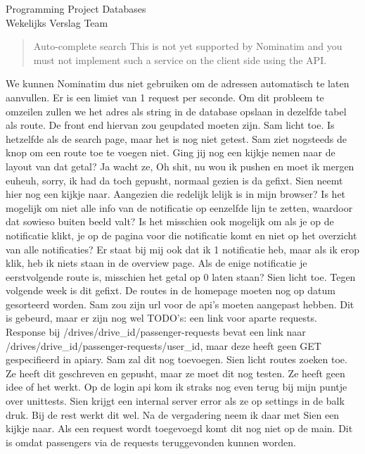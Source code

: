 \documentclass{article}
\newcounter{team}
\begin{document}
\begin{Minutes}{Programming Project Databases \\ Wekelijks Verslag Team }
\begin{quote}
                        Auto-complete search This is not yet supported by Nominatim and you must not implement such a service on the client side using the API.
				    \end{quote}
				    We kunnen Nominatim dus niet gebruiken om de adressen automatisch te laten aanvullen. Er is een limiet van 1 request per seconde. Om dit probleem te omzeilen zullen we het adres als string in de database opslaan in dezelfde tabel als route.
				    De front end hiervan zou geupdated moeten zijn. Sam licht toe. Is hetzelfde als de search page, maar het is nog niet getest. Sam ziet nogsteeds de knop om een route toe te voegen niet.
				  Ging jij nog een kijkje nemen naar de layout van dat getal? Ja wacht ze, Oh shit, nu wou ik pushen en moet ik mergen euheuh, sorry, ik had da toch gepusht, normaal gezien is da gefixt. Sien neemt hier nog een kijkje naar. Aangezien die redelijk lelijk is in mijn browser? Is het mogelijk om niet alle info van de notificatie op eenzelfde lijn te zetten, waardoor dat sowieso buiten beeld valt? Is het misschien ook mogelijk om als je op de notificatie klikt, je op de pagina voor die notificatie komt en niet op het overzicht van alle notificaties? Er staat bij mij ook dat ik 1 notificatie heb, maar als ik erop klik, heb ik niets staan in de overview page. Als de enige notificatie je eerstvolgende route is, misschien het getal op 0 laten staan? Sien licht toe. Tegen volgende week is dit gefixt.
                    De routes in de homepage moeten nog op datum gesorteerd worden.
				    Sam zou zijn url voor de api's moeten aangepast hebben. Dit is gebeurd, maar er zijn nog wel TODO's: een link voor aparte requests. Response bij /drives/drive\_id/passenger-requests bevat een link naar /drives/drive\_id/passenger-requests/user\_id, maar deze heeft geen GET gespecifieerd in apiary. Sam zal dit nog toevoegen.
				    Sien licht routes zoeken toe. Ze heeft dit geschreven en gepusht, maar ze moet dit nog testen. Ze heeft geen idee of het werkt.
				    Op de login api kom ik straks nog even terug bij mijn puntje over unittests.
				    Sien krijgt een internal server error als ze op settings in de balk druk. Bij de rest werkt dit wel. Na de vergadering neem ik daar met Sien een kijkje naar.
				    Als een request wordt toegevoegd komt dit nog niet op de main. Dit is omdat passengers via de requests teruggevonden kunnen worden.

\end{Minutes}
\end{document}
